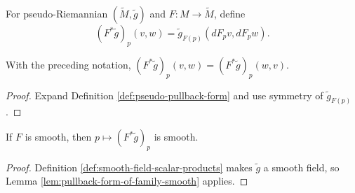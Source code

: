 \begin{definition}
\label{def:pseudo-pullback-form}





For pseudo-Riemannian $(\widetilde M,\widetilde g)$ and $F:M\to\widetilde M$, define
\[
(F^*\widetilde g)_p(v,w)=\widetilde g_{F(p)}(dF_pv,dF_pw).
\]
\end{definition}

\begin{lemma}
\label{lem:pseudo-pullback-form-symm}





With the preceding notation, $(F^*\widetilde g)_p(v,w)=(F^*\widetilde g)_p(w,v)$.
\end{lemma}
\begin{proof}

\sketch Expand Definition \ref{def:pseudo-pullback-form} and use symmetry of $\widetilde g_{F(p)}$.
\end{proof}

\begin{lemma}
\label{lem:pseudo-pullback-form-smooth}





If $F$ is smooth, then $p\mapsto(F^*\widetilde g)_p$ is smooth.
\end{lemma}
\begin{proof}

\sketch Definition \ref{def:smooth-field-scalar-products} makes $\widetilde g$ a smooth field, so Lemma \ref{lem:pullback-form-of-family-smooth} applies.
\end{proof}

